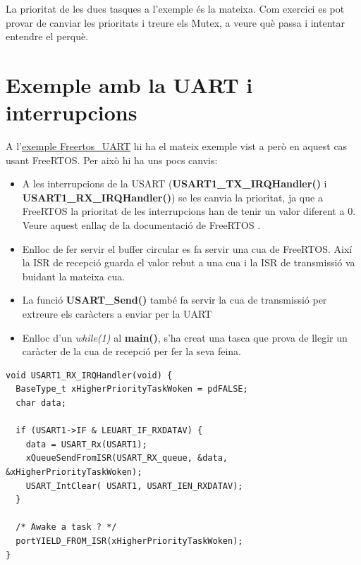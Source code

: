 \begin{exercise}
La prioritat de les dues tasques a l'exemple és la mateixa. Com exercici es pot provar de canviar les prioritats i treure els Mutex, a veure què passa i intentar entendre el perquè.
\end{exercise}

\chapter{Exemple amb la UART i interrupcions}
A l’\href{https://github.com/mariusmm/cursembedded/tree/master/Simplicity/FreeRTOS_UART}{exemple Freertos\_UART} hi ha el mateix exemple vist a  però en aquest cas usant FreeRTOS. Per això hi ha uns pocs canvis:
\begin{itemize}
 \item A les interrupcions de la USART ({\bf USART1\_TX\_IRQHandler()} i {\bf USART1\_RX\_IRQHandler()}) se les canvia la prioritat, ja que a FreeRTOS la prioritat de les interrupcions han de tenir un valor diferent a 0. Veure aquest enllaç de la documentació de FreeRTOS \cite{FreeRTOSIRQ}.
 \item Enlloc de fer servir el \gls{buffer circular} es fa servir una cua de FreeRTOS. Així la \gls{ISR} de recepció guarda el valor rebut a una cua i la \gls{ISR} de transmissió va buidant la mateixa cua.
 \item La funció {\bf USART\_Send()} també fa servir la cua de transmissió per extreure els caràcters a enviar per la UART
 \item Enlloc d’un {\em while(1)} al {\bf main()}, s'ha creat una tasca que prova de llegir un caràcter de la cua de recepció per fer la seva feina.
\end{itemize}

 \begin{lstlisting}[style=customc,caption={ISR de RX de la UART amb FreeRTOS}]
void USART1_RX_IRQHandler(void) {
  BaseType_t xHigherPriorityTaskWoken = pdFALSE;
  char data;

  if (USART1->IF & LEUART_IF_RXDATAV) {
    data = USART_Rx(USART1);
    xQueueSendFromISR(USART_RX_queue, &data, &xHigherPriorityTaskWoken);
    USART_IntClear( USART1, USART_IEN_RXDATAV);
  }

  /* Awake a task ? */
  portYIELD_FROM_ISR(xHigherPriorityTaskWoken);
}
\end{lstlisting}

